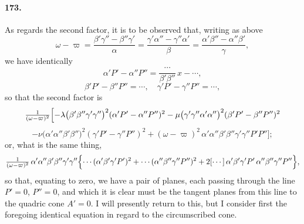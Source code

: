 \documentclass[11pt,a4paper]{article}
\begin{document}
\paragraph{173.}
As regards the second factor, it is to be observed that, writing as above
\[
\omega - \varpi = \frac{\beta'\gamma'' - \beta''\gamma'}{\alpha}
= \frac{\gamma'\alpha'' - \gamma''\alpha'}{\beta}
= \frac{\alpha'\beta'' - \alpha''\beta'}{\gamma},
\]
we have identically
\[
\alpha'P' - \alpha''P'' = \frac{\dotsb}{\beta'\beta''}\, x - \dotsb,
\]
\[
\beta'P' - \beta''P'' = \dotsb,\quad
\gamma'P' - \gamma''P'' = \dotsb,
\]
so that the second factor is
\[
\tfrac{1}{(\omega - \varpi)^2}\Bigl[
- \lambda\bigl(\beta'\beta''\gamma'\gamma''\bigr)^2 (\alpha'P' - \alpha''P'')^2
- \mu\bigl(\gamma'\gamma''\alpha'\alpha''\bigr)^2 (\beta'P' - \beta''P'')^2
\]
\[
- \nu\bigl(\alpha'\alpha''\beta'\beta''\bigr)^2 (\gamma'P' - \gamma''P'')^2
+ (\omega - \varpi)^2\,\alpha'\alpha''\beta'\beta''\gamma'\gamma'' P'P''\Bigr];
\]
or, what is the same thing,
\[
\tfrac{1}{(\omega - \varpi)^2}\,\alpha'\alpha''\beta'\beta''\gamma'\gamma''\Bigl\{
\dotsb (\alpha'\beta'\gamma' P')^2 + \dotsb (\alpha''\beta''\gamma'' P'')^2
+ 2 [\dotsb]\,\alpha'\beta'\gamma' P'\,\alpha''\beta''\gamma'' P''\Bigr\},
\]
so that, equating to zero, we have a pair of planes, each passing through
the line $P' = 0$, $P'' = 0$, and which it is clear must be the tangent
planes from this line to the quadric cone $A' = 0$. I will presently
return to this, but I consider first the foregoing identical equation in
regard to the circumscribed cone.
\end{document}
